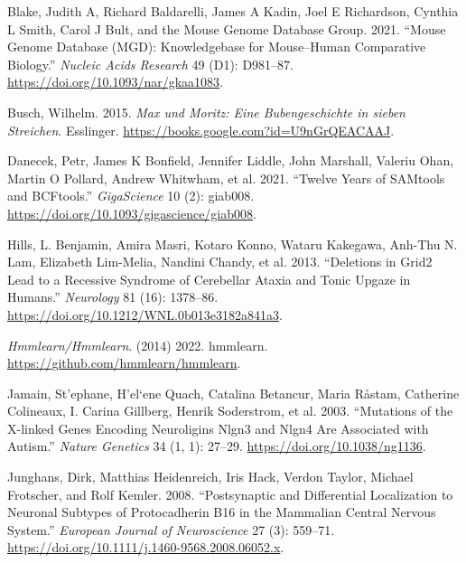 \documentclass[
]{book}
\newlength{\cslhangindent}
\newlength{\cslentryspacingunit} %
\newenvironment{CSLReferences}[2] %
 {%
  \setlength{\parindent}{0pt}
  \ifodd #1
  \let\oldpar\par
  \def\par{\hangindent=\cslhangindent\oldpar}
  \fi
  \setlength{\parskip}{#2\cslentryspacingunit}
 }%
 {}
\begin{document}
\hypertarget{refs}{}
\begin{CSLReferences}{1}{0}
\leavevmode{}%
Blake, Judith A, Richard Baldarelli, James A Kadin, Joel E Richardson, Cynthia L Smith, Carol J Bult, and the Mouse Genome Database Group. 2021. {``Mouse {Genome Database} ({MGD}): {Knowledgebase} for Mouse--Human Comparative Biology.''} \emph{Nucleic Acids Research} 49 (D1): D981--87. \url{https://doi.org/10.1093/nar/gkaa1083}.

\leavevmode{}%
Busch, Wilhelm. 2015. \emph{Max und Moritz: Eine Bubengeschichte in sieben Streichen}. {Esslinger}. \url{https://books.google.com?id=U9nGrQEACAAJ}.

\leavevmode{}%
Danecek, Petr, James K Bonfield, Jennifer Liddle, John Marshall, Valeriu Ohan, Martin O Pollard, Andrew Whitwham, et al. 2021. {``Twelve Years of {SAMtools} and {BCFtools}.''} \emph{GigaScience} 10 (2): giab008. \url{https://doi.org/10.1093/gigascience/giab008}.

\leavevmode{}%
Hills, L. Benjamin, Amira Masri, Kotaro Konno, Wataru Kakegawa, Anh-Thu N. Lam, Elizabeth Lim-Melia, Nandini Chandy, et al. 2013. {``Deletions in {Grid2} Lead to a Recessive Syndrome of Cerebellar Ataxia and Tonic Upgaze in Humans.''} \emph{Neurology} 81 (16): 1378--86. \url{https://doi.org/10.1212/WNL.0b013e3182a841a3}.

\leavevmode{}%
\emph{Hmmlearn/Hmmlearn}. (2014) 2022. {hmmlearn}. \url{https://github.com/hmmlearn/hmmlearn}.

\leavevmode{}%
Jamain, St'ephane, H'el`ene Quach, Catalina Betancur, Maria Råstam, Catherine Colineaux, I. Carina Gillberg, Henrik Soderstrom, et al. 2003. {``Mutations of the {X-linked} Genes Encoding Neuroligins {Nlgn3} and {Nlgn4} Are Associated with Autism.''} \emph{Nature Genetics} 34 (1, 1): 27--29. \url{https://doi.org/10.1038/ng1136}.

\leavevmode{}%
Junghans, Dirk, Matthias Heidenreich, Iris Hack, Verdon Taylor, Michael Frotscher, and Rolf Kemler. 2008. {``Postsynaptic and Differential Localization to Neuronal Subtypes of Protocadherin Β16 in the Mammalian Central Nervous System.''} \emph{European Journal of Neuroscience} 27 (3): 559--71. \url{https://doi.org/10.1111/j.1460-9568.2008.06052.x}.


\end{CSLReferences}
\end{document}
